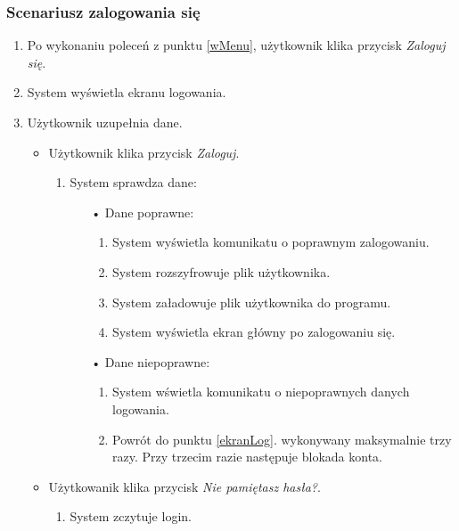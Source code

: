 \documentclass[a4paper]{article}
\begin{document}
\subsubsection{Scenariusz zalogowania się}
\begin{enumerate}
    \item Po wykonaniu poleceń z punktu \ref{wMenu}, użytkownik klika przycisk \textit{Zaloguj się}.
    \item System wyświetla ekranu logowania. \label{ekranLog}
    \item Użytkownik uzupełnia dane.
    \begin{itemize}
        \item Użytkownik klika przycisk \textit{Zaloguj}.
            \begin{enumerate}
                \item System sprawdza dane:
                \begin{itemize}
                    \item[•] Dane poprawne:
                    \begin{enumerate}
                        \item System wyświetla  komunikatu o poprawnym zalogowaniu.
                        \item System rozszyfrowuje plik użytkownika.
                        \item System załadowuje plik użytkownika do programu.
                        \item System wyświetla ekran główny po zalogowaniu się.
                    \end{enumerate}
                    \item[•] Dane niepoprawne:
                    \begin{enumerate}
                        \item System wświetla komunikatu o niepoprawnych danych logowania.
                        \item Powrót do punktu \ref{ekranLog}. wykonywany maksymalnie trzy razy. Przy trzecim razie następuje blokada konta.
                    \end{enumerate}
                \end{itemize}
            \end{enumerate}
        \item Użytkowanik klika przycisk \textit{Nie pamiętasz hasła?}.
        \begin{enumerate}
            \item System zczytuje login.

\end{enumerate}
\end{itemize}
\end{enumerate}
\end{document}
